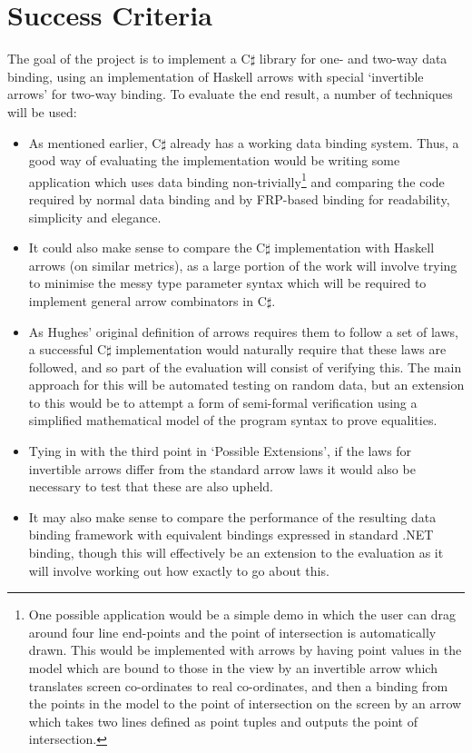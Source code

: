\documentclass[12pt,a4]{article}
\begin{document}
\section{Success Criteria}
	The goal of the project is to implement a C$\sharp$ library for one- and two-way data binding, using an implementation of Haskell arrows with special `invertible arrows' for two-way binding. To evaluate the end result, a number of techniques will be used:
	
	\begin{itemize}
		\item As mentioned earlier, C$\sharp$ already has a working data binding system. Thus, a good way of evaluating the implementation would be writing some application which uses data binding non-trivially\footnote{One possible application would be a simple demo in which the user can drag around four line end-points and the point of intersection is automatically drawn. This would be implemented with arrows by having point values in the model which are bound to those in the view by an invertible arrow which translates screen co-ordinates to real co-ordinates, and then a binding from the points in the model to the point of intersection on the screen by an arrow which takes two lines defined as point tuples and outputs the point of intersection.} and comparing the code required by normal data binding and by FRP-based binding for readability, simplicity and elegance.
		
		\item It could also make sense to compare the C$\sharp$ implementation with Haskell arrows (on similar metrics), as a large portion of the work will involve trying to minimise the messy type parameter syntax which will be required to implement general arrow combinators in C$\sharp$.
		
		\item As Hughes' original definition of arrows requires them to follow a set of laws, a successful C$\sharp$ implementation would naturally require that these laws are followed, and so part of the evaluation will consist of verifying this. The main approach for this will be automated testing on random data, but an extension to this would be to attempt a form of semi-formal verification using a simplified mathematical model of the program syntax to prove equalities.
		
		\item Tying in with the third point in `Possible Extensions', if the laws for invertible arrows differ from the standard arrow laws it would also be necessary to test that these are also upheld.
		
		\item It may also make sense to compare the performance of the resulting data binding framework with equivalent bindings expressed in standard .NET binding, though this will effectively be an extension to the evaluation as it will involve working out how exactly to go about this.
	\end{itemize}
\end{document}
